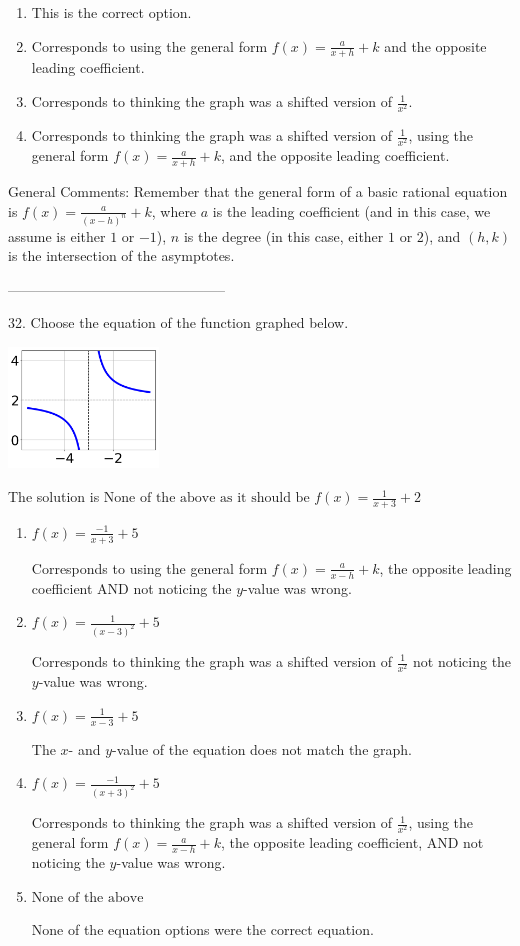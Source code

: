 \documentclass{extbook}[14pt]
\begin{document}
\begin{enumerate}[label=\Alph*.] 
\item This is the correct option.  
\item Corresponds to using the general form $f(x) = \frac{a}{x+h}+k$ and the opposite leading coefficient.  
\item Corresponds to thinking the graph was a shifted version of $\frac{1}{x^2}$.  
\item Corresponds to thinking the graph was a shifted version of $\frac{1}{x^2}$, using the general form $f(x) = \frac{a}{x+h}+k$, and the opposite leading coefficient.  
\end{enumerate} 
 
General Comments: Remember that the general form of a basic rational equation is $ f(x) = \frac{a}{(x-h)^n} + k$, where $a$ is the leading coefficient (and in this case, we assume is either $1$ or $-1$), $n$ is the degree (in this case, either $1$ or $2$), and $(h, k)$ is the intersection of the asymptotes.

-----------------------------------------------

32. Choose the equation of the function graphed below.
\begin{center} \includegraphics[width=0.3\textwidth]{../Figures/rationalGraphToEquationA.png} \end{center} 

The solution is $ \text{None of the above as it should be } f(x) = \frac{1}{x + 3} + 2 $ 

\begin{enumerate}[label=\Alph*.] 
\item $ f(x) = \frac{-1}{x + 3} + 5 $ 

 Corresponds to using the general form $f(x) = \frac{a}{x-h}+k$, the opposite leading coefficient AND not noticing the $y$-value was wrong. 
\item $ f(x) = \frac{1}{(x - 3)^2} + 5 $ 

 Corresponds to thinking the graph was a shifted version of $\frac{1}{x^2}$ not noticing the $y$-value was wrong. 
\item $ f(x) = \frac{1}{x - 3} + 5 $ 

 The $x$- and $y$-value of the equation does not match the graph. 
\item $ f(x) = \frac{-1}{(x + 3)^2} + 5 $ 

 Corresponds to thinking the graph was a shifted version of $\frac{1}{x^2}$, using the general form $f(x) = \frac{a}{x-h}+k$, the opposite leading coefficient, AND not noticing the $y$-value was wrong. 
\item $ \text{None of the above} $ 

 None of the equation options were the correct equation. 
\end{enumerate} 
 
\end{document}

